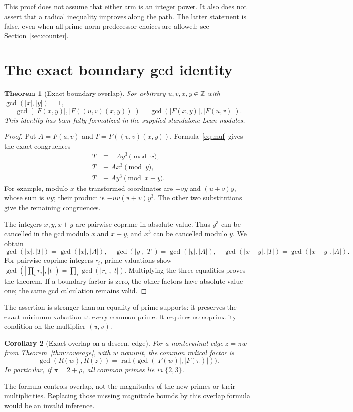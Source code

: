 \documentclass[11pt]{article}
\newtheorem{theorem}{Theorem}[section]
\newtheorem{corollary}[theorem]{Corollary}
\theoremstyle{definition}
\theoremstyle{remark}
\newcommand{\rad}{\operatorname{rad}}
\newcommand{\ZZ}{\mathbb Z}
\newcommand{\gcdabs}[2]{\gcd\!\left(|#1|,|#2|\right)}
\begin{document}
This proof does not assume that either arm is an integer power. It also does not assert that a radical inequality improves along the path. The latter statement is false, even when all prime-norm predecessor choices are allowed; see Section~\ref{sec:counter}.

\section{The exact boundary gcd identity}
\begin{theorem}[Exact boundary overlap]\label{thm:gcd}
For arbitrary $u,v,x,y\in\ZZ$ with $\gcd(|x|,|y|)=1$,
\begin{equation}\label{eq:gcd}
\gcdabs{F(x,y)}{F((u,v)(x,y))}
=\gcdabs{F(x,y)}{F(u,v)}.
\end{equation}
This identity has been fully formalized in the supplied standalone Lean modules.
\end{theorem}
\begin{proof}
Put $A=F(u,v)$ and $T=F((u,v)(x,y))$. Formula~\eqref{eq:mul} gives the exact congruences
\begin{align}
T&\equiv-Ay^3\pmod{x},\label{eq:remx}\\
T&\equiv Ax^3\pmod{y},\\
T&\equiv Ay^3\pmod{x+y}.
\end{align}
For example, modulo $x$ the transformed coordinates are $-vy$ and $(u+v)y$, whose sum is $uy$; their product is $-uv(u+v)y^3$. The other two substitutions give the remaining congruences.

The integers $x,y,x+y$ are pairwise coprime in absolute value. Thus $y^3$ can be cancelled in the gcd modulo $x$ and $x+y$, and $x^3$ can be cancelled modulo $y$. We obtain
\[
\gcdabs{x}{T}=\gcdabs{x}{A},\quad
\gcdabs{y}{T}=\gcdabs{y}{A},\quad
\gcdabs{x+y}{T}=\gcdabs{x+y}{A}.
\]
For pairwise coprime integers $r_i$, prime valuations show
$\gcd(|\prod_i r_i|,|t|)=\prod_i\gcd(|r_i|,|t|)$.
Multiplying the three equalities proves the theorem. If a boundary factor is zero, the other factors have absolute value one; the same gcd calculation remains valid.
\end{proof}

The assertion is stronger than an equality of prime supports: it preserves the exact minimum valuation at every common prime. It requires no coprimality condition on the multiplier $(u,v)$.

\begin{corollary}[Exact overlap on a descent edge]
For a nonterminal edge $z=\pi w$ from Theorem~\ref{thm:coverage}, with $w$ nonunit, the common radical factor is
\[
\gcd(R(w),R(z))=\rad\bigl(\gcd(|F(w)|,|F(\pi)|)\bigr).
\]
In particular, if $\pi=2+\rho$, all common primes lie in $\{2,3\}$.
\end{corollary}
The formula controls overlap, not the magnitudes of the new primes or their multiplicities. Replacing those missing magnitude bounds by this overlap formula would be an invalid inference.
\end{document}
